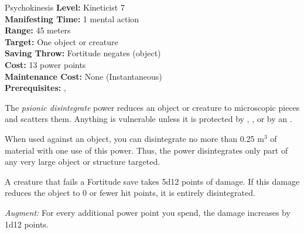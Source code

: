 {Psychokinesis}
{
	\textbf{Level:}
	Kineticist 7\\
	\textbf{Manifesting Time:}
	1 mental action\\
	\textbf{Range:}
	45 meters\\
	\textbf{Target:}
	One object or creature\\
	\textbf{Saving Throw:}
	Fortitude negates (object)\\
	\textbf{Cost:}
	13 power points\\
	\textbf{Maintenance Cost:}
	None (Instantaneous)\\
	\textbf{Prerequisites:}
	, \\
}
{
	The \emph{psionic disintegrate} power reduces an object or creature to microscopic pieces and scatters them. Anything is vulnerable unless it is protected by , , or by an .

	When used against an object, you can disintegrate no more than 0.25 m$^3$ of material with one use of this power. Thus, the power disintegrates only part of any very large object or structure targeted.

	A creature that fails a Fortitude save takes 5d12 points of damage. If this damage reduces the object to 0 or fewer hit points, it is entirely disintegrated.

	\emph{Augment:} For every additional power point you spend, the damage increases by 1d12 points.
}